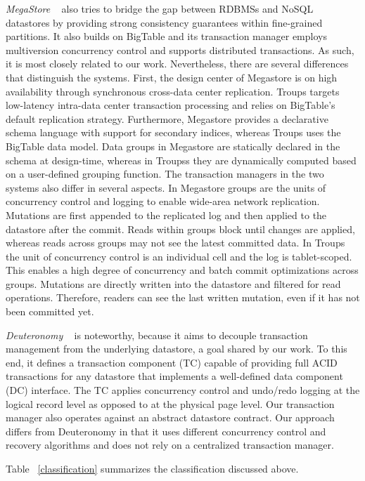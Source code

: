 \documentclass[10pt,final,journal]{IEEEtran}
\begin{document}
\emph{MegaStore} ~\cite{Furman:2008:8530095, Baker:2011:8530095} also tries to bridge the gap between RDBMSs and NoSQL datastores by providing strong consistency guarantees within fine-grained partitions. It also builds on BigTable and its transaction manager employs multiversion concurrency control and supports distributed transactions. As such, it is most closely related to our work. Nevertheless, there are several differences that distinguish the systems. First, the design center of Megastore is on high availability through synchronous cross-data center replication. Troups targets low-latency intra-data center transaction processing and relies on BigTable's default replication strategy. Furthermore, Megastore provides a declarative schema language with support for secondary indices, whereas Troups uses the BigTable data model. Data groups in Megastore are statically declared in the schema at design-time, whereas in Troupss they are dynamically computed based on a user-defined grouping function. The transaction managers in the two systems also differ in several aspects. In Megastore groups are the units of concurrency control and logging to enable wide-area network replication. Mutations are first appended to the replicated log and then applied to the datastore after the commit. Reads within groups block until changes are applied, whereas reads across groups may not see the latest committed data. In Troups the unit of concurrency control is an individual cell and the log is tablet-scoped. This enables a high degree of concurrency and batch commit optimizations across groups. Mutations are directly written into the datastore and filtered for read operations. Therefore, readers can see the last written mutation, even if it has not been committed yet.

\emph{Deuteronomy} ~\cite{Levandoski:2011:8530161} is noteworthy, because it aims to decouple transaction management from the underlying datastore, a goal shared by our work. To this end, it defines a transaction component (TC) capable of providing full ACID transactions for any datastore that implements a well-defined data component (DC) interface. The TC applies concurrency control and undo/redo logging at the logical record level as opposed to at the physical page level. Our transaction manager also operates against an abstract datastore contract. Our approach differs from Deuteronomy in that it uses different concurrency control and recovery algorithms and does not rely on a centralized transaction manager.

Table ~\ref{classification} summarizes the classification discussed above.
\end{document}

